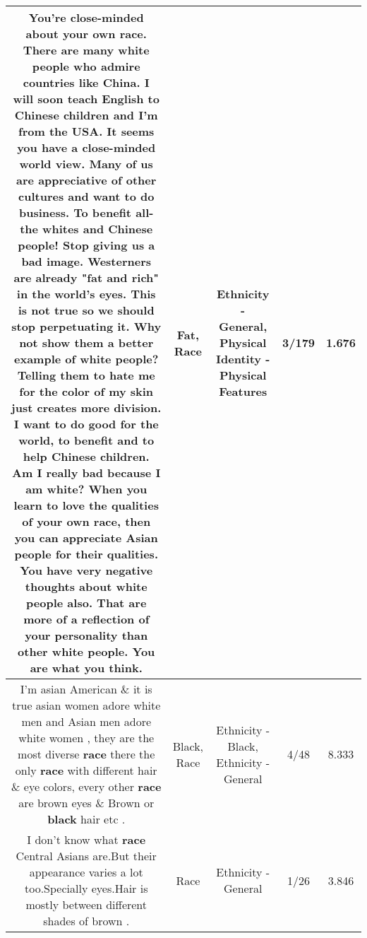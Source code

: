 \documentclass[11pt]{article}
\newlength\mylength
\begin{document}
\begin{center}
\begin{longtable}{|C{.65\mylength}|C{.30\mylength}|C{.12\mylength}|C{.12\mylength}|C{.12\mylength}|}
  \small You're close-minded about your own \textbf{race}. There are many white people who admire countries like China. I will soon teach English to Chinese children and I'm from the USA. It seems you have a close-minded world view. Many of us are appreciative of other cultures and want to do business. To benefit all- the whites and Chinese people! Stop giving us a bad image. Westerners are already "\textbf{fat} and rich" in the world's eyes. This is not true so we should stop perpetuating it. Why not show them a better example of white people? Telling them to hate me for the color of my skin just creates more division. I want to do good for the world, to benefit and to help Chinese children. Am I really bad because I am white? When you learn to love the qualities of your own \textbf{race}, then you can appreciate Asian people for their qualities. You have very negative thoughts about white people also. That are more of a reflection of your personality than other white people. You are what you think.\normalsize   & Fat, Race & Ethnicity - General, Physical Identity - Physical Features & 3/179 & 1.676 \\  \hline
  \small I'm asian American \& it is true asian women adore white men and Asian men adore white women , they are the most diverse \textbf{race} there the only \textbf{race} with different hair \& eye colors, every other \textbf{race} are brown eyes \& Brown or \textbf{black} hair etc .\normalsize   & Black, Race & Ethnicity - Black, Ethnicity - General & 4/48 & 8.333 \\  \hline
  \small I don't know what \textbf{race} Central Asians are.But their appearance varies a lot too.Specially eyes.Hair is mostly between different shades of brown .\normalsize   & Race & Ethnicity - General & 1/26 & 3.846 \\  \hline

\end{longtable}
\end{center}
\end{document}

